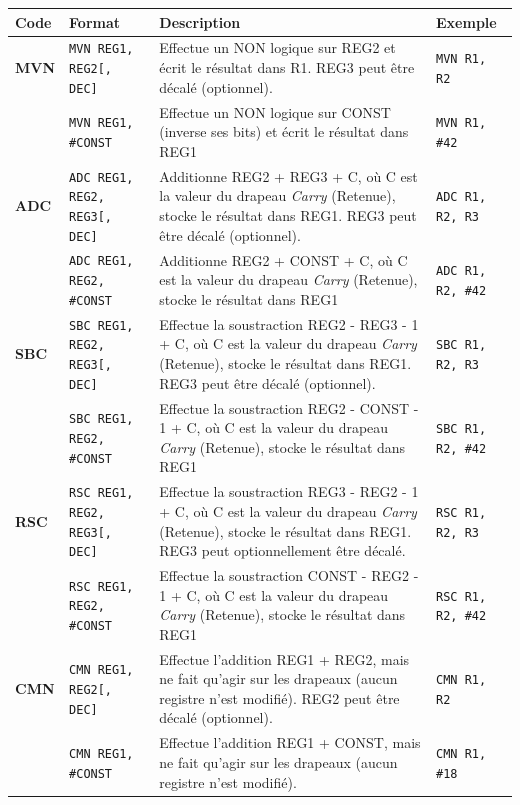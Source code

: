 \documentclass{tufte-handout}
\begin{document}
\begin{table}
\begin{tabular}{l|l|p{7.5cm}l}
Code & Format & Description & Exemple \\ \hline
\textbf{MVN} & \texttt{MVN REG1, REG2[, DEC]} 	& Effectue un NON logique sur REG2 et écrit le résultat dans R1. REG3 peut être décalé (optionnel). & \texttt{MVN R1, R2} \\
 			 & \texttt{MVN REG1, \#CONST} 			& Effectue un NON logique sur CONST (inverse ses bits) et écrit le résultat dans REG1 & \texttt{MVN R1, \#42} \\
\hline
\textbf{ADC} & \texttt{ADC REG1, REG2, REG3[, DEC]} 	& Additionne REG2 + REG3 + C, où C est la valeur du drapeau \textit{Carry} (Retenue), stocke le résultat dans REG1. REG3 peut être décalé (optionnel). & \texttt{ADC R1, R2, R3} \\
 			 & \texttt{ADC REG1, REG2, \#CONST} 			& Additionne REG2 + CONST + C, où C est la valeur du drapeau \textit{Carry} (Retenue), stocke le résultat dans REG1 & \texttt{ADC R1, R2, \#42} \\
\hline
\textbf{SBC} & \texttt{SBC REG1, REG2, REG3[, DEC]} 	& Effectue la soustraction REG2 - REG3 - 1 + C, où C est la valeur du drapeau \textit{Carry} (Retenue), stocke le résultat dans REG1. REG3 peut être décalé (optionnel). & \texttt{SBC R1, R2, R3} \\
 			 & \texttt{SBC REG1, REG2, \#CONST} 			& Effectue la soustraction REG2 - CONST - 1 + C, où C est la valeur du drapeau \textit{Carry} (Retenue), stocke le résultat dans REG1 & \texttt{SBC R1, R2, \#42} \\
\hline
\textbf{RSC} & \texttt{RSC REG1, REG2, REG3[, DEC]} 	& Effectue la soustraction REG3 - REG2 - 1 + C, où C est la valeur du drapeau \textit{Carry} (Retenue), stocke le résultat dans REG1. REG3 peut optionnellement être décalé. & \texttt{RSC R1, R2, R3} \\
 			 & \texttt{RSC REG1, REG2, \#CONST} 			& Effectue la soustraction CONST - REG2 - 1 + C, où C est la valeur du drapeau \textit{Carry} (Retenue), stocke le résultat dans REG1 & \texttt{RSC R1, R2, \#42} \\
\hline
\textbf{CMN} & \texttt{CMN REG1, REG2[, DEC]} 	& Effectue l'addition REG1 + REG2, mais ne fait qu'agir sur les drapeaux (aucun registre n'est modifié). REG2 peut être décalé (optionnel). & \texttt{CMN R1, R2} \\
 			 & \texttt{CMN REG1, \#CONST} 			& Effectue l'addition REG1 + CONST, mais ne fait qu'agir sur les drapeaux (aucun registre n'est modifié). & \texttt{CMN R1, \#18} \\

\end{tabular}
\end{table}
\end{document}
